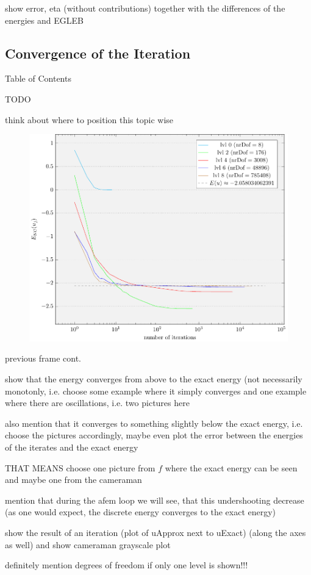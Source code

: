 \begin{frame}
  show error, eta (without contributions) together with the differences
  of the energies and EGLEB
\end{frame}

\subsection{Convergence of the Iteration} \begin{frame}[noframenumbering]{Table of Contents}
\end{frame}

\begin{frame}{TODO}

  think about where to position this topic wise

  \begin{figure}[!ht]
    \centering
    \includegraphics[width=0.8\linewidth]
      {pictures/experiments/convergenceIteration/convergenceIteration.pdf}
  \end{figure}

\end{frame}

\begin{frame}
  previous frame cont.

  show that the energy converges from above to the exact energy (not
  necessarily monotonly, i.e. choose some example where it simply converges
  and one example where there are oscillations, i.e. two pictures here

  also mention that it converges to something slightly below the exact energy,
  i.e. choose the pictures accordingly, maybe even plot the error between
  the energies of the iterates and the exact energy

  THAT MEANS choose one picture from $f$ where the exact energy can be seen 
  and maybe one from the cameraman

  mention that during the afem loop we will see, that this undershooting 
  decrease (as one would expect, the discrete energy converges to the exact
  energy)
\end{frame}

\begin{frame}
  show the result of an iteration (plot of uApprox next to uExact) 
  (along the axes as well)
  and show cameraman grayscale plot

  definitely mention degrees of freedom if only one level is shown!!!
\end{frame}
